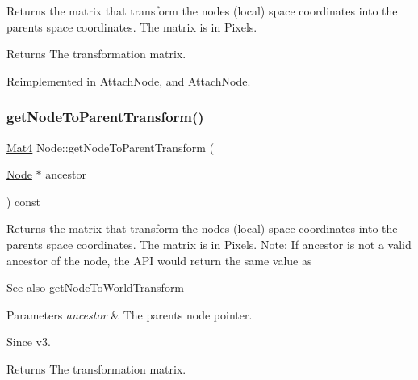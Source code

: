 Returns the matrix that transform the node\textquotesingle{}s (local) space coordinates into the parent\textquotesingle{}s space coordinates. The matrix is in Pixels.

\begin{DoxyReturn}{Returns}
The transformation matrix. 
\end{DoxyReturn}


Reimplemented in \hyperlink{classAttachNode_a0b751dd5e5c67cada4ab1e27f67f8a71}{Attach\+Node}, and \hyperlink{classAttachNode_acff1e6467b97ca416e45af09c28028d6}{Attach\+Node}.

\mbox{\label{classNode_a0cc9a3bec00628f37f4742378bdcfcca}} 
\subsubsection{\texorpdfstring{get\+Node\+To\+Parent\+Transform()}{getNodeToParentTransform()}\hspace{0.1cm}{\footnotesize\ttfamily [2/4]}}
{\footnotesize\ttfamily \hyperlink{classMat4}{Mat4} Node\+::get\+Node\+To\+Parent\+Transform (\begin{DoxyParamCaption}\item[{\hyperlink{classNode}{Node} $\ast$}]{ancestor }\end{DoxyParamCaption}) const\hspace{0.3cm}{\ttfamily [virtual]}}

Returns the matrix that transform the node\textquotesingle{}s (local) space coordinates into the parent\textquotesingle{}s space coordinates. The matrix is in Pixels. Note\+: If ancestor is not a valid ancestor of the node, the A\+PI would return the same value as \begin{DoxySeeAlso}{See also}
\hyperlink{classNode_a1e46065101d0d5dba32262067d85bf23}{get\+Node\+To\+World\+Transform}
\end{DoxySeeAlso}

\begin{DoxyParams}{Parameters}
{\em ancestor} & The parent\textquotesingle{}s node pointer. \\
\hline
\end{DoxyParams}
\begin{DoxySince}{Since}
v3. 
\end{DoxySince}
\begin{DoxyReturn}{Returns}
The transformation matrix. 
\end{DoxyReturn}
\mbox{\label{classNode_a58894159c8240ab57a3d62fd6a455c23}} 
